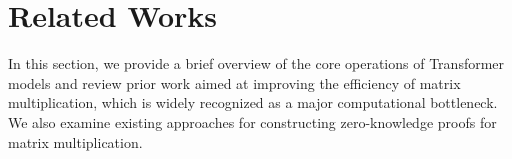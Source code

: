 \documentclass[sigconf,anonymous,review,balance=false]{acmart}
\begin{document}
\section{Related Works}
In this section, we provide a brief overview of the core operations of Transformer models and review prior work aimed at improving the efficiency of matrix multiplication, which is widely recognized as a major computational bottleneck. We also examine existing approaches for constructing zero-knowledge proofs for matrix multiplication.
\end{document}
